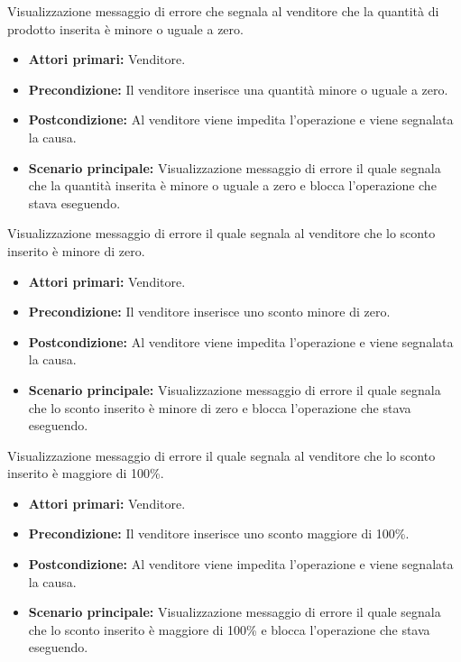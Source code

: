 Visualizzazione messaggio di errore che segnala al venditore che la quantità di prodotto inserita è minore o uguale a zero.
\begin{itemize}
    \item \textbf{Attori primari:} Venditore.
    \item \textbf{Precondizione:} Il venditore inserisce una quantità minore o uguale a zero.
    \item \textbf{Postcondizione:} Al venditore viene impedita l'operazione e viene segnalata la causa.
    \item \textbf{Scenario principale:} Visualizzazione messaggio di errore il quale segnala che la quantità inserita è minore o uguale a zero e blocca l'operazione che stava eseguendo.
\end{itemize}

Visualizzazione messaggio di errore il quale segnala al venditore che lo sconto inserito è minore di zero.
\begin{itemize}
    \item \textbf{Attori primari:} Venditore.
    \item \textbf{Precondizione:} Il venditore inserisce uno sconto minore di zero.
    \item \textbf{Postcondizione:} Al venditore viene impedita l'operazione e viene segnalata la causa.
    \item \textbf{Scenario principale:} Visualizzazione messaggio di errore il quale segnala che lo sconto inserito è minore di zero e blocca l'operazione che stava eseguendo.
\end{itemize}

Visualizzazione messaggio di errore il quale segnala al venditore che lo sconto inserito è maggiore di 100\%.
\begin{itemize}
    \item \textbf{Attori primari:} Venditore.
    \item \textbf{Precondizione:} Il venditore inserisce uno sconto maggiore di 100\%.
    \item \textbf{Postcondizione:} Al venditore viene impedita l'operazione e viene segnalata la causa.
    \item \textbf{Scenario principale:} Visualizzazione messaggio di errore il quale segnala che lo sconto inserito è maggiore di 100\% e blocca l'operazione che stava eseguendo.
\end{itemize}

